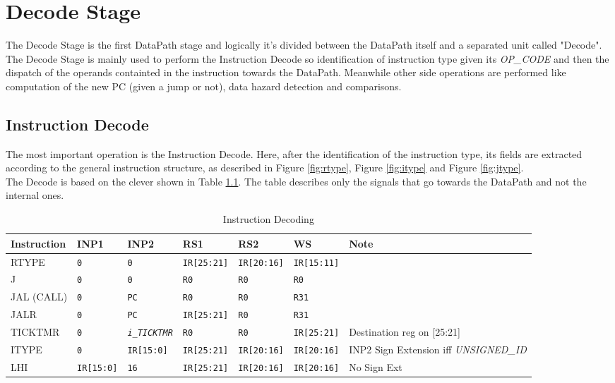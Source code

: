 \chapter{Decode Stage}
\label{sec:decode_stage}

The Decode Stage is the first DataPath stage and logically it's divided between the DataPath itself and a separated unit called "Decode". The Decode Stage is mainly used to perform the Instruction Decode so identification of instruction type given its \emph{OP\_CODE} and then the dispatch of the operands containted in the instruction towards the DataPath. Meanwhile other side operations are performed like computation of the new PC (given a jump or not), data hazard detection and comparisons.


\section{Instruction Decode}

The most important operation is the Instruction Decode. Here, after the identification of the instruction type, its fields are extracted according to the general instruction structure, as described in Figure \ref{fig:rtype}, Figure \ref{fig:itype} and Figure \ref{fig:jtype}.\\

The Decode is based on the clever shown in Table \ref{table:decode_instr}. The table describes only the signals that go towards the DataPath and not the internal ones.

\begin{table}[H]
    \centering
    \begin{tabularx}{\textwidth}{|l|l|l|l|l|l|X|}
        \hline
        \textbf{Instruction} & INP1 & INP2 & RS1 & RS2 & WS & Note\\
        \hline
        RTYPE & \texttt{0} & \texttt{0} & \texttt{IR[25:21]} & \texttt{IR[20:16]} & \texttt{IR[15:11]} & \\
        \hline
        J & \texttt{0} & \texttt{0} & \texttt{R0} & \texttt{R0} & \texttt{R0} & \\
        \hline
        JAL (CALL) & \texttt{0} & \texttt{PC} & \texttt{R0} & \texttt{R0} & \texttt{R31} & \\
        \hline
        JALR & \texttt{0} & \texttt{PC} & \texttt{IR[25:21]} & \texttt{R0} & \texttt{R31} & \\
        \hline
        TICKTMR & \texttt{0} & \texttt{\emph{i\_TICKTMR}} & \texttt{R0} & \texttt{R0} & \texttt{IR[25:21]} & Destination reg on [25:21]\\
        \hline
        ITYPE & \texttt{0} & \texttt{IR[15:0]} & \texttt{IR[25:21]} & \texttt{IR[20:16]} & \texttt{IR[20:16]} & INP2 Sign Extension iff \emph{UNSIGNED\_ID}\\
        \hline
        LHI & \texttt{IR[15:0]} & \texttt{16} & \texttt{IR[25:21]} & \texttt{IR[20:16]} & \texttt{IR[20:16]} & No Sign Ext\\
        \hline
    \end{tabularx}
    \caption{Instruction Decoding}
    \label{table:decode_instr}
\end{table}

